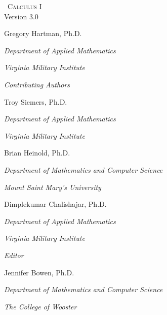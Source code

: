 
\hskip 125pt\begin{minipage}{\textwidth}
\begin{flushright}

\textsc{\large \apex\ {\Huge Calculus I}} \\

{\small Version 3.0}\\

\Large
\vspace{1in}

Gregory Hartman, Ph.D.

\emph{\small Department of Applied Mathematics}

\emph{\small Virginia Military Institute}\vskip15pt

\parbox{200pt}{\textit{Contributing Authors}}\hskip 2cm \phantom{.}

Troy Siemers, Ph.D.

\emph{\small Department of Applied Mathematics}

\emph{\small Virginia Military Institute}\vskip 15pt

Brian Heinold, Ph.D.

\emph{\small Department of Mathematics and Computer Science}

\emph{\small Mount Saint Mary's University}\vskip 15pt

Dimplekumar Chalishajar, Ph.D.

\emph{\small Department of Applied Mathematics}

\emph{\small Virginia Military Institute}\vskip 25pt

\parbox{200pt}{\textit{Editor}}\hskip 2cm \phantom{.}

Jennifer Bowen, Ph.D.

\emph{\small Department of Mathematics and Computer Science}

\emph{\small The College of Wooster}

\normalsize
\end{flushright}
\end{minipage}

